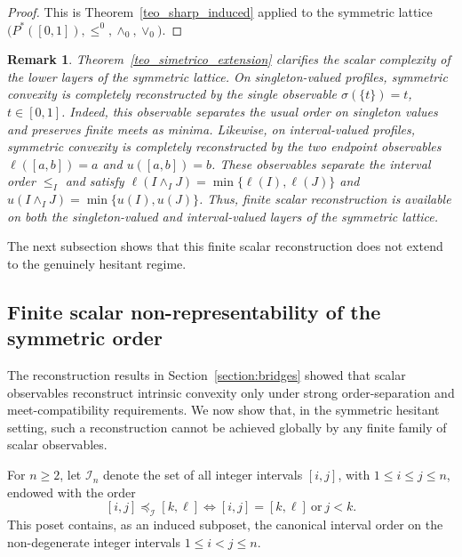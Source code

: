\documentclass[11pt,a4paper]{article}
\newtheorem{remark}{Remark}
\begin{document}
\begin{proof}
This is Theorem~\ref{teo_sharp_induced} applied to the symmetric lattice \(\bigl(P^*([0,1]),\leq^0,\wedge_0,\vee_0\bigr)\).
\end{proof}

\begin{remark}\label{rem:scalar-reconstruction-layers}
Theorem~\ref{teo_simetrico_extension} clarifies the scalar complexity of the lower layers of the symmetric lattice. On singleton-valued profiles, symmetric convexity is completely reconstructed by the single observable \(\sigma(\{t\})=t\), \(t\in[0,1]\). Indeed, this observable separates the usual order on singleton values and preserves finite meets as minima. Likewise, on interval-valued profiles, symmetric convexity is completely reconstructed by the two endpoint observables \(\ell([a,b])=a\) and \(u([a,b])=b\). These observables separate the interval order \(\leq_I\) and satisfy
\(\ell(I\wedge_I J)=\min\{\ell(I),\ell(J)\}\) and
\(u(I\wedge_I J)=\min\{u(I),u(J)\}\).
Thus, finite scalar reconstruction is available on both the singleton-valued and interval-valued layers of the symmetric lattice.

\end{remark}


The next subsection shows that this finite scalar reconstruction does not extend to the genuinely hesitant regime.



\subsection{Finite scalar non-representability of the symmetric order}

\smallskip

The reconstruction results in Section~\ref{section:bridges} showed that scalar observables reconstruct intrinsic convexity only under strong order-separation and meet-compatibility requirements. We now show that, in the symmetric hesitant setting, such a reconstruction cannot be achieved globally by any finite family of scalar observables.

\smallskip

For \(n\ge 2\), let \(\mathcal I_n\) denote the set of all integer intervals \([i,j]\), with \(1\le i\le j\le n\), endowed with the order
\[
[i,j]\preceq_{\mathcal I}[k,\ell]
\Longleftrightarrow
[i,j]=[k,\ell]\ \text{or}\ j<k.
\]
This poset contains, as an induced subposet, the canonical interval order on the non-degenerate integer intervals \(1\le i<j\le n\).
\end{document}

